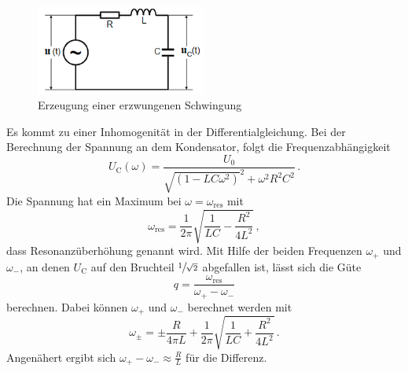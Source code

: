 \begin{figure}
    \centering
    \caption{Erzeugung einer erzwungenen Schwingung \cite{}} 
    \label{fig:erzw}
    \includegraphics[width = 0.5\textwidth]{pics/Erzwungen.png}
\end{figure}
Es kommt zu einer Inhomogenität in der 
Differentialgleichung. Bei der Berechnung der Spannung an dem Kondensator, folgt die Frequenzabhängigkeit
\begin{equation}
    U_\text{C}(\omega)= \frac{U_0}{\sqrt{\left(1-LC\omega^2\right)}^2 + \omega^2 R^2 C^2} \, .
\end{equation}
Die Spannung hat ein Maximum bei $\omega=\omega_\text{res}$ mit 
\begin{equation}
    \omega_\text{res}= \frac{1}{2 \pi} \sqrt{\frac{1}{L C} - \frac{R^2}{4 L^2}} \, ,
\end{equation}
dass Resonanzüberhöhung genannt wird. Mit Hilfe der beiden Frequenzen $\omega_+$ und $\omega_-$, an denen $U_\text{C}$ auf den Bruchteil $\sfrac{1}{\sqrt{2}}$
abgefallen ist, lässt sich die Güte 
\begin{equation}
    q=\frac{\omega_\text{res}}{\omega_+ - \omega_-}
\end{equation}
berechnen. Dabei können $\omega_+$ und $\omega_-$ berechnet werden mit
\begin{equation}
    \omega_\pm= \pm \frac{R}{4 \pi L} + \frac{1}{2\pi} \sqrt{\frac{1}{L C} + \frac{R^2}{4 L^2}} \, .
\end{equation}
Angenähert ergibt sich $\omega_+ - \omega_- \approx \frac{R}{L}$ für die Differenz.